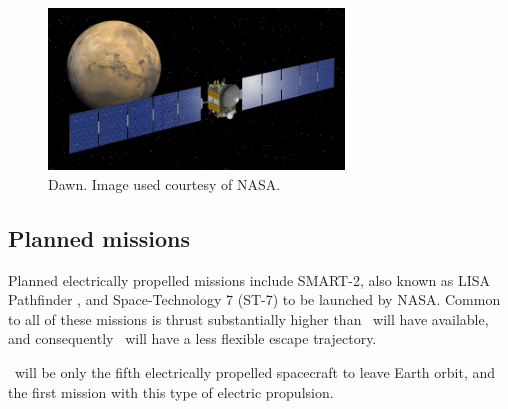 \begin{figure}[ht]
  \begin{center}
  \includegraphics  [width=0.7\textwidth] {Images/mars-browse.jpg}
  \end{center}
  \caption{Dawn. Image used courtesy of NASA.}
  \label{fig:Dawn}
\end{figure}

\subsection{Planned missions}
Planned electrically propelled missions include SMART-2, also known as LISA Pathfinder \parencite{web_SMART-2}, and Space-Technology 7 (ST-7) to be launched by NASA. Common to all of these missions is thrust substantially higher than \BW\ will have available, and consequently \BW\ will have a less flexible escape trajectory.

\BW\ will be only the fifth electrically propelled spacecraft to leave Earth orbit, and the first mission with this type of electric propulsion.





